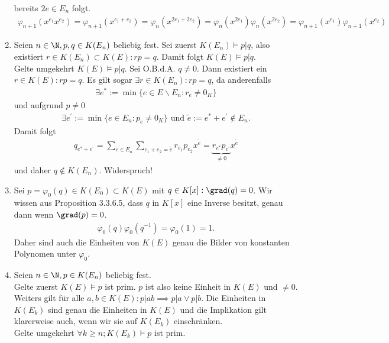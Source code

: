 \begin{solution}
\begin{enumerate}
  bereits $2e \in E_n$ folgt.
  \begin{align*}
    \varphi_{n+1}(x^{e_1}x^{e_2}) = \varphi_{n+1}(x^{e_1 + e_2}) = \varphi_n(x^{2e_1 + 2e_2})
    = \varphi_n(x^{2e_1})\varphi_n(x^{2e_2}) = \varphi_{n+1}(x^{e_1})\varphi_{n+1}(x^{e_2})
  \end{align*}
  \item Seien $n \in \N, p,q \in K(E_n)$ beliebig fest.
  Sei zuerst $K(E_n) \vDash p|q$, also existiert $r \in K(E_n) \subset K(E): rp = q$.
  Damit folgt $ K(E) \vDash p|q$. \\
  Gelte umgekehrt $K(E) \vDash p | q$. Sei O.B.d.A. $q \neq 0$.
  Dann existiert ein $r \in K(E): rp = q $.
  Es gilt sogar $\exists r \in K(E_n): rp = q$, da anderenfalls
  \begin{align*}
    \exists e^* := \min \{e \in E\backslash E_n: r_e \neq 0_K\}
  \end{align*}
  und aufgrund $p \neq 0$
  \begin{align*}
    \exists e^{\prime} := \min \{e \in E_n: p_e \neq 0_K\} \text{ und }
    \widetilde{e} := e^* + e^{\prime} \notin E_n.
  \end{align*}
  Damit folgt
  \begin{align*}
    q_{e^* + e^{\prime}} = \sum_{e \in E_n}\sum_{e_1 + e_2 = \widetilde{e}}r_{e_1}p_{e_2}x^{\widetilde{e}}
    = \underbrace{r_{e^*}p_{e^{\prime}}}_{\neq 0}x^{\widetilde{e}}
  \end{align*}
  und daher $q \notin K(E_n)$. Widerspruch!
  \item Sei $p = \varphi_0(q) \in K(E_0) \subset K(E)$ mit $q \in K[x]: \grad(q) = 0$.
  Wir wissen aus Proposition 3.3.6.5, dass $q$ in $K[x]$ eine Inverse besitzt, genau
  dann wenn $\grad(p) = 0$.
  \begin{align*}
    \varphi_0(q)\varphi_0(q^{-1}) = \varphi_0(1) = 1.
  \end{align*}
  Daher sind auch die Einheiten von $K(E)$ genau die Bilder von konstanten Polynomen
  unter $\varphi_0$.
  \item Seien $n \in \N, p \in K(E_n)$ beliebig fest. \\
  Gelte zuerst $K(E) \vDash p$ ist prim. $p$ ist also keine Einheit in $K(E)$
  und $\neq 0$. Weiters gilt für alle $a,b \in K(E): p|ab \implies p|a \lor p|b$.
  Die Einheiten in $K(E_k)$ sind genau die Einheiten in $K(E)$ und die Implikation
  gilt klarerweise auch, wenn wir sie auf $K(E_k)$ einschränken. \\
  Gelte umgekehrt $\forall k \geq n; K(E_k) \vDash p$ ist prim.

\end{enumerate}
\end{solution}
